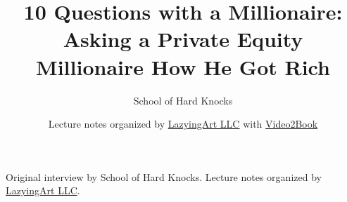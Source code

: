 \documentclass[11pt,oneside]{book}
\begin{document}
\frontmatter
\title{10 Questions with a Millionaire: Asking a Private Equity Millionaire How He Got Rich}
\author{School of Hard Knocks}
\date{Lecture notes organized by \href{https://lazying.art}{LazyingArt LLC} with \href{https://github.com/lachlanchen/Video2Book}{Video2Book}}
\maketitle
\begin{center}
\small Original interview by School of Hard Knocks. Lecture notes organized by \href{https://lazying.art}{LazyingArt LLC}.
\end{center}
\clearpage
\mainmatter

\end{document}
